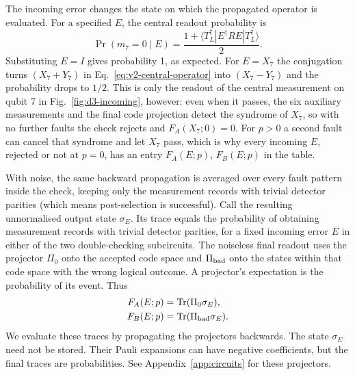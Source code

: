 The incoming error changes the state on which the propagated operator
is evaluated. For a specified $E$, the central readout probability is
\begin{equation}
 \Pr(m_7=0\mid E)
 =\frac{1+\langle T_L^\dagger|E^\dagger R E|T_L^\dagger\rangle}{2}.
 \label{eq:v2-incoming-mean}
\end{equation}
Substituting $E=I$ gives probability 1, as expected. For $E=X_7$ the conjugation turns $(X_7+Y_7)$ in Eq.~\eqref{eq:v2-central-operator} into $(X_7-Y_7)$ and the probability drops to $1/2$. This is only the readout of the central measurement on qubit 7 in Fig.~\ref{fig:d3-incoming}, however: even when it passes, the six auxiliary measurements and the final code projection detect the syndrome of $X_7$, so with no further faults the check rejects and $F_A(X_7;0)=0$. For $p>0$ a second fault can cancel that syndrome and let $X_7$ pass, which is why every incoming $E$, rejected or not at $p=0$, has an entry $F_A(E;p)$, $F_B(E;p)$ in the table.

With noise, the same backward propagation is averaged over every fault pattern inside the check, keeping only the measurement records with trivial detector parities (which means post-selection is successful). Call the resulting
unnormalised output state $\sigma_E$. Its trace equals the probability of obtaining measurement records
with trivial detector parities, for a fixed incoming error $E$ in either of the two double-checking subcircuits.
The noiseless final readout uses the projector $\Pi_0$ onto the
accepted code space and $\Pi_{\rm bad}$ onto the states within
that code space with the wrong logical outcome. A projector's expectation is the probability
of its event. Thus
\begin{equation}
 \begin{aligned}
 F_A(E;p)&=\operatorname{Tr}(\Pi_0\sigma_E),\\
 F_B(E;p)&=\operatorname{Tr}(\Pi_{\rm bad}\sigma_E).
 \end{aligned}
 \label{eq:response-projectors}
\end{equation}
We evaluate these traces by propagating the projectors backwards. The state $\sigma_E$ need not be stored.
Their Pauli expansions can have negative coefficients, but the final
traces are probabilities. See Appendix~\ref{app:circuits} for these projectors.

